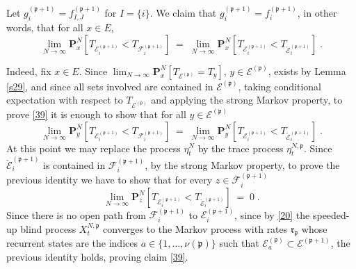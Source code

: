 \documentclass[reqno]{amsart}
\begin{document}
Let $g^{({{\mathfrak p}}+1)}_i = f^{({{\mathfrak p}}+1)}_{I,J}$ for $I=\{i\}$.  We claim
that $g^{({{\mathfrak p}}+1)}_i = f^{({{\mathfrak p}}+1)}_{i}$, in other words, that for
all $x\in E$,
\begin{equation}
\label{39}
\lim_{N\to\infty} {{\mathbf P}}^{N}_x[T_{{{\mathcal E}}^{({{\mathfrak p}} +1)}_{i}} < 
T_{{{\mathcal F}}^{({{\mathfrak p}} +1)}_i}] \;=\;
\lim_{N\to\infty} {{\mathbf P}}^{N}_x[T_{{{\mathcal E}}^{({{\mathfrak p}} +1)}_{i}} < 
T_{\breve{{{\mathcal E}}}^{({{\mathfrak p}} +1)}_i}] \;.
\end{equation}

Indeed, fix $x\in E$.  Since $\lim_{N\to\infty} {{\mathbf P}}^{N}_x[T_{{{\mathcal E}}^{({{\mathfrak p}})}} =T_y]$, $y\in {{\mathcal E}}^{({{\mathfrak p}})}$, exists by Lemma
\ref{s29}, and since all sets involved are contained in ${{\mathcal E}}^{({{\mathfrak p}})}$, taking conditional expectation with respect to $T_{{{\mathcal E}}^{({{\mathfrak p}})}}$ and applying the strong Markov property, to prove \eqref{39}
it is enough to show that for all $y\in {{\mathcal E}}^{({{\mathfrak p}})}$
\begin{equation*}
\lim_{N\to\infty} {{\mathbf P}}^{N}_y[T_{{{\mathcal E}}^{({{\mathfrak p}} +1)}_{i}} < 
T_{{{\mathcal F}}^{({{\mathfrak p}} +1)}_i}] \;=\;
\lim_{N\to\infty} {{\mathbf P}}^{N}_y[T_{{{\mathcal E}}^{({{\mathfrak p}} +1)}_{i}} < 
T_{\breve{{{\mathcal E}}}^{({{\mathfrak p}} +1)}_i}] \;.
\end{equation*}
At this point we may replace the process $\eta^N_t$ by the trace
process $\eta^{N,{{\mathfrak p}}}_t$. Since $\breve{{{\mathcal E}}}^{({{\mathfrak p}} +1)}_i$ is
contained in ${{\mathcal F}}^{({{\mathfrak p}} +1)}_i$, by the strong Markov property, to
prove the previous identity we have to show that for every $z\in {{\mathcal F}}^{({{\mathfrak p}} +1)}_i$
\begin{equation*}
\lim_{N\to\infty} {{\mathbf P}}^{N}_z[T_{{{\mathcal E}}^{({{\mathfrak p}} +1)}_{i}} < 
T_{\breve{{{\mathcal E}}}^{({{\mathfrak p}} +1)}_i}] \;=\; 0\;.
\end{equation*}
Since there is no open path from ${{\mathcal F}}^{({{\mathfrak p}} +1)}_i$ to ${{\mathcal E}}^{({{\mathfrak p}} +1)}_{i}$, since by \eqref{20} the speeded-up blind process
$X^{N,{{\mathfrak p}}}_t$ converges to the Markov process with rates ${{\mathfrak r}}_{{{\mathfrak p}}}$ whose recurrent states are the indices $a \in \{1, \dots,
\nu({{\mathfrak p}})\}$ such that ${{\mathcal E}}^{({{\mathfrak p}})}_a \subset {{\mathcal E}}^{({{\mathfrak p}}
  +1)}$, the previous identity holds, proving claim \eqref{39}.
\end{document}
